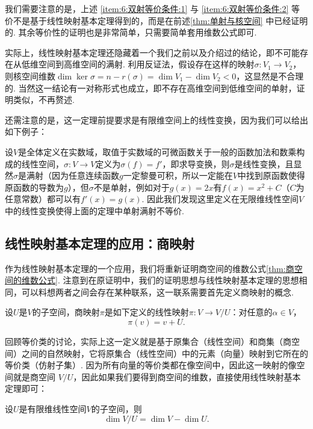 我们需要注意的是，上述 \ref*{item:6:双射等价条件:1} 与 \ref*{item:6:双射等价条件:2} 等价不是基于线性映射基本定理得到的，而是在前述\autoref{thm:单射与核空间} 中已经证明的. 其余等价性的证明也是非常简单，只需要简单套用维数公式即可.

实际上，线性映射基本定理还隐藏着一个我们之前以及介绍过的结论，即不可能存在从低维空间到高维空间的满射. 利用反证法，假设存在这样的映射$\sigma:V_1\to V_2$，则核空间维数$\dim\ker\sigma=n-r(\sigma)=\dim V_1-\dim V_2<0$，这显然是不合理的. 当然这一结论有一对称形式也成立，即不存在高维空间到低维空间的单射，证明类似，不再赘述.

还需注意的是，这一定理前提要求是有限维空间上的线性变换，因为我们可以给出如下例子：

\begin{example}{}{}
    设$V$是全体定义在实数域，取值于实数域的可微函数关于一般的函数加法和数乘构成的线性空间，$\sigma:V\to V$定义为$\sigma(f)=f'$，即求导变换，则$\sigma$是线性变换，且显然$\sigma$是满射（因为任意连续函数$g$一定黎曼可积，所以一定能在$V$中找到原函数使得原函数的导数为$g$），但$\sigma$不是单射，例如对于$g(x)=2x$有$f(x)=x^2+C$（$C$为任意常数）都可以有$f'(x)=g(x)$. 因此我们发现这里定义在无限维线性空间$V$中的线性变换使得上面的定理中单射满射不等价.
\end{example}

\subsection{线性映射基本定理的应用：商映射}

作为线性映射基本定理的一个应用，我们将重新证明商空间的维数公式\autoref{thm:商空间的维数公式}. 注意到在原证明中，我们的证明思想与线性映射基本定理的思想相同，可以料想两者之间会存在某种联系，这一联系需要首先定义商映射的概念.

\begin{definition}{}{}
    设$U$是$V$的子空间，商映射$\pi$是如下定义的线性映射$\pi:V\to V/U$：对任意的$\alpha\in V$，
    \[\pi(v)=v+U.\]
\end{definition}

回顾等价类的讨论，实际上这一定义就是基于原集合（线性空间）和商集（商空间）之间的自然映射，它将原集合（线性空间）中的元素（向量）映射到它所在的等价类（仿射子集）. 因为所有向量的等价类都在像空间中，因此这一映射的像空间就是商空间 $V/U$，因此如果我们要得到商空间的维数，直接使用线性映射基本定理即可：

\begin{theorem}{}{}
    设$U$是有限维线性空间$V$的子空间，则
    \[\dim V/U=\dim V-\dim U.\]
\end{theorem}

